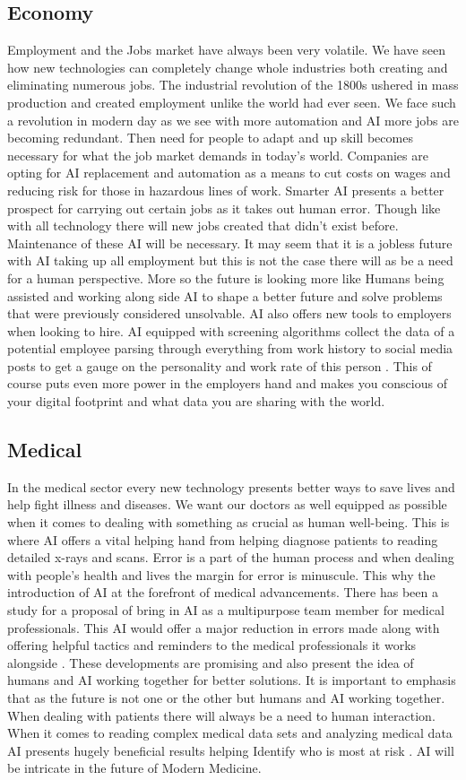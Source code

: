 \documentclass[conference]{IEEEtran}
\begin{document}
\subsection{Economy}
Employment and the Jobs market have always been very volatile. We have seen how new technologies can completely change whole industries both creating and eliminating numerous jobs. The industrial revolution of the 1800s ushered in mass production and created employment unlike the world had ever seen. We face such a revolution in modern day as we see with more automation and AI more jobs are becoming redundant. Then need for people to adapt and up skill becomes necessary for what the job market demands in today's world. Companies are opting for AI replacement and automation as a means to cut costs on wages and reducing risk for those in hazardous lines of work. Smarter AI presents a better prospect for carrying out certain jobs as it takes out human error. Though like with all technology there will new jobs created that didn't exist before. Maintenance of these AI will be necessary. It may seem that it is a jobless future with AI taking up all employment but this is not the case there will as be a need for a human perspective. More so the future is looking more like Humans being assisted and working along side AI to shape a better future and solve problems that were previously considered unsolvable. AI also offers new tools to employers when looking to hire. AI equipped with screening algorithms collect the data of a potential employee parsing through everything from work history to social media posts to get a gauge on the personality and work rate of this person \cite{Employers}. This of course puts even more power in the employers hand and makes you conscious of your digital footprint and what data you are sharing with the world. 
\subsection{Medical}
In the medical sector every new technology presents better ways to save lives and help fight illness and diseases. We want our doctors as well equipped as possible when it comes to dealing with something as crucial as human well-being. This is where AI offers a vital helping hand from helping diagnose patients to reading detailed x-rays and scans. Error is a part of the human process and when dealing with people's health and lives the margin for error is minuscule. This why the introduction of AI at the forefront of medical advancements. There has been a study for a proposal of bring in AI as a multipurpose team member for medical professionals. This AI would offer a major reduction in errors made along with offering helpful tactics and reminders to the medical professionals it works alongside \cite{AIDoc}. These developments are promising and also present the idea of humans and AI working together for better solutions. It is important to emphasis that as the future is not one or the other but humans and AI working together. When dealing with patients there will always be a need to human interaction. When it comes to reading complex medical data sets and analyzing medical data AI presents hugely beneficial results helping Identify who is most at risk \cite{atRisk}. AI will be intricate in the future of Modern Medicine. 
\end{document}
